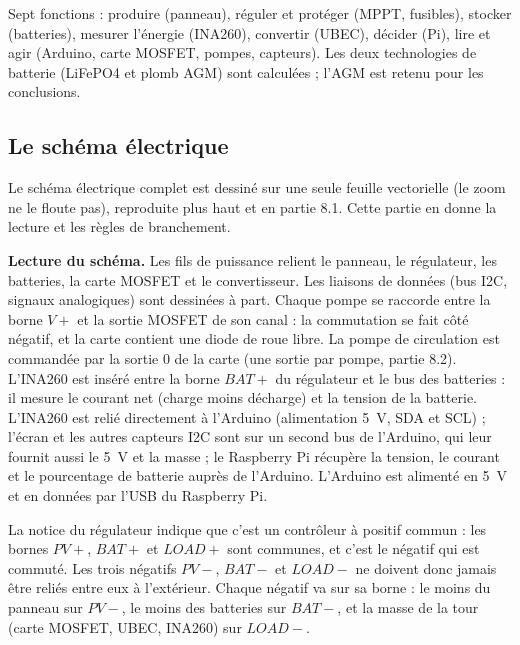 \begin{aretenir}
Sept fonctions : produire (panneau), réguler et protéger (MPPT, fusibles), stocker (batteries), mesurer l'énergie (INA260), convertir (UBEC), décider (Pi), lire et agir (Arduino, carte MOSFET, pompes, capteurs). Les deux technologies de batterie (LiFePO4 et plomb AGM) sont calculées ; l'AGM est retenu pour les conclusions.
\end{aretenir}

\subsection{Le schéma électrique}

Le schéma électrique complet est dessiné sur une seule feuille vectorielle (le zoom ne le floute pas), reproduite plus haut et en partie 8.1. Cette partie en donne la lecture et les règles de branchement.


\textbf{Lecture du schéma.} Les fils de puissance relient le panneau, le régulateur, les batteries, la carte MOSFET et le convertisseur. Les liaisons de données (bus I2C, signaux analogiques) sont dessinées à part. Chaque pompe se raccorde entre la borne $V+$ et la sortie MOSFET de son canal : la commutation se fait côté négatif, et la carte contient une diode de roue libre. La pompe de circulation est commandée par la sortie 0 de la carte (une sortie par pompe, partie 8.2). L'INA260 est inséré entre la borne $BAT+$ du régulateur et le bus des batteries : il mesure le courant net (charge moins décharge) et la tension de la batterie. L'INA260 est relié directement à l'Arduino (alimentation \qty{5}{V}, SDA et SCL) ; l'écran et les autres capteurs I2C sont sur un second bus de l'Arduino, qui leur fournit aussi le \qty{5}{V} et la masse ; le Raspberry Pi récupère la tension, le courant et le pourcentage de batterie auprès de l'Arduino. L'Arduino est alimenté en \qty{5}{V} et en données par l'USB du Raspberry Pi.



La notice du régulateur indique que c'est un contrôleur à positif commun : les bornes $PV+$, $BAT+$ et $LOAD+$ sont communes, et c'est le négatif qui est commuté. Les trois négatifs $PV-$, $BAT-$ et $LOAD-$ ne doivent donc jamais être reliés entre eux à l'extérieur. Chaque négatif va sur sa borne : le moins du panneau sur $PV-$, le moins des batteries sur $BAT-$, et la masse de la tour (carte MOSFET, UBEC, INA260) sur $LOAD-$.

